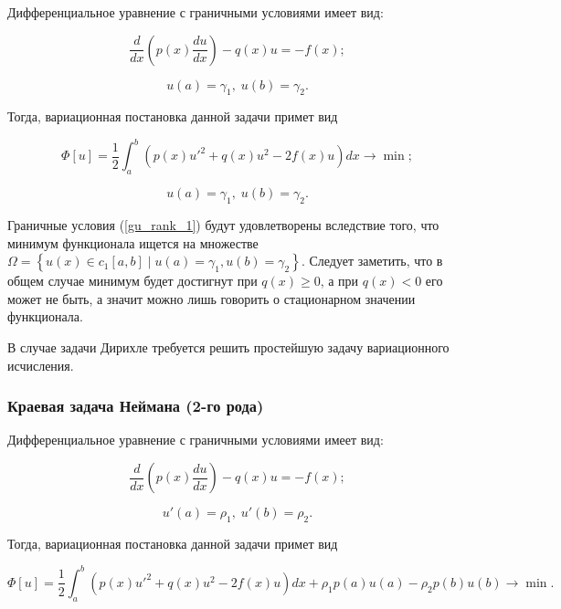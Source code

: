 \documentclass{article}
\begin{document}
Дифференциальное уравнение с граничными условиями имеет вид:

\begin{displaymath}
	\frac{d }{dx} \left( p(x) \frac{du}{dx} \right) - q(x)u = -f(x);
\end{displaymath}

\begin{equation} \label{gu_rank_1}
	u(a) = \gamma_{1}, \; u(b) = \gamma_{2}.
\end{equation}

\noindent Тогда, вариационная постановка данной задачи примет вид

\begin{displaymath}
	\Phi[u] = \frac{1}{2} \int_{a}^{b} \left( p(x)u'^{2} + q(x)u^{2} - 2f(x)u \right)dx \to \min;
\end{displaymath}

\begin{displaymath}
	u(a) = \gamma_{1}, \; u(b) = \gamma_{2}.
\end{displaymath}

Граничные условия (\ref{gu_rank_1}) будут удовлетворены вследствие того, что минимум функционала ищется на множестве $\Omega = \left\{ u(x) \in c_{1}\left[ a, b \right] \; | \; u(a)=\gamma_{1}, u(b)=\gamma_{2} \right\}$. Следует заметить, что в общем случае минимум будет достигнут при $q(x) \geq 0$, а при $q(x) < 0$ его может не быть, а значит можно лишь говорить о стационарном значении функционала.

В случае задачи Дирихле требуется решить простейшую задачу вариационного исчисления.

\subsubsection{Краевая задача Неймана (2-го рода)}

Дифференциальное уравнение с граничными условиями имеет вид:

\begin{displaymath}
	\frac{d }{dx} \left( p(x) \frac{du}{dx} \right) - q(x)u = -f(x);
\end{displaymath}

\begin{equation} \label{gu_rank_2}
	u'(a) = \rho_{1}, \; u'(b) = \rho_{2}.
\end{equation}

\noindent Тогда, вариационная постановка данной задачи примет вид

\begin{displaymath}
	\Phi[u] = \frac{1}{2} \int_{a}^{b} \left( p(x)u'^{2} + q(x)u^{2} - 2f(x)u \right)dx + \rho_{1}p(a)u(a) - \rho_{2}p(b)u(b) \to \min.
\end{displaymath}
\end{document}
